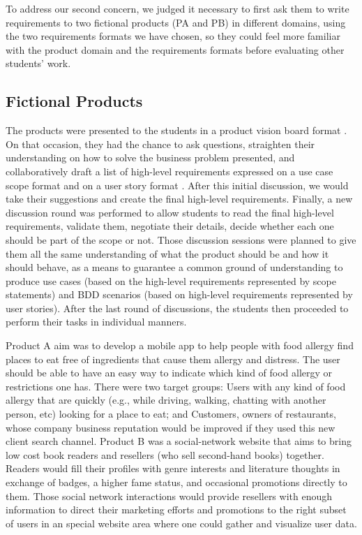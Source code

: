 To address our second concern, we judged it necessary to first ask them to write requirements to two fictional products (PA and PB) in different domains, using the two requirements formats we have chosen, so they could feel more familiar with the product domain and the requirements formats before evaluating other students' work. 

\subsection{Fictional Products}

The products were presented to the students in a product vision board format \cite{VisionBoard}. On that occasion, they had the chance to ask questions, straighten their understanding on how to solve the business problem presented, and collaboratively draft a list of high-level requirements expressed on a use case scope format \cite{Cockburn_2000} and on a user story format \cite{Cockburn_2000}. After this initial discussion, we would take their suggestions and create the final high-level requirements. Finally, a new discussion round was performed to allow students to read the final high-level requirements, validate them, negotiate their details, decide whether each one should be part of the scope or not. Those discussion sessions were planned to give them all the same understanding of what the product should be and how it should behave, as a means to guarantee a common ground of understanding to produce use cases (based on the high-level requirements represented by scope statements) and BDD scenarios (based on high-level requirements represented by user stories). After the last round of discussions, the students then proceeded to perform their tasks in individual manners.

Product A aim was to develop a mobile app to help people with food allergy find places to eat free of ingredients that cause them allergy and distress. The user should be able to have an easy way to indicate which kind of food allergy or restrictions one has. There were two target groups: Users with any kind of food allergy that are quickly (e.g., while driving, walking, chatting with another person, etc) looking for a place to eat; and Customers, owners of restaurants, whose company business reputation would be improved if they used this new client search channel. Product B was a social-network website that aims to bring low cost book readers and resellers (who sell second-hand books) together. Readers would fill their profiles with genre interests and literature thoughts in exchange of badges, a higher fame status, and occasional promotions directly to them. Those social network interactions would provide resellers with enough information to direct their marketing efforts and promotions to the right subset of users in an special website area where one could gather and visualize user data.

